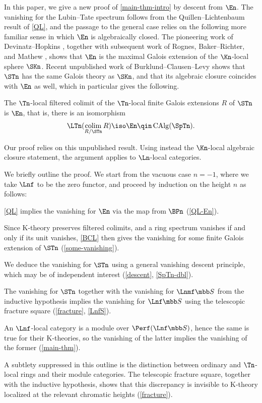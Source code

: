 In this paper, we give a new proof of \cref{main-thm-intro} by descent from $\En$.
The vanishing for the Lubin--Tate spectrum follows from the Quillen--Lichtenbaum result of \cref{QL}, and the passage to the general case relies on the following more familiar sense in which $\En$ is algebraically closed.
The pioneering work of Devinatz--Hopkins \cite{DH}, together with subsequent work of Rognes, Baker--Richter, and Mathew \cite{RognesGalois,BR-Galois,MatGal}, shows that $\En$ is the maximal Galois extension of the $\Kn$-local sphere $\SKn$.
Recent unpublished work of Burklund--Clausen--Levy shows that $\STn$ has the same Galois theory as $\SKn$, and that its algebraic closure coincides with $\En$ as well, which in particular gives the following.

\begin{thm}\label{BCL}
	The $\Tn$-local filtered colimit of the $\Tn$-local finite Galois extensions $R$ of $\STn$ is $\En$, that is, there is an isomorphism
	\[
		\LTn(\colim_{R/\STn} R) \iso \En
		\qin \CAlg(\SpTn).
	\]
\end{thm}

\begin{remark}
	Our proof relies on this unpublished result.
	Using instead the $\Kn$-local algebraic closure statement, the argument applies to $\Ln$-local categories.
\end{remark}

We briefly outline the proof.
We start from the vacuous case $n = -1$, where we take $\Lnf$ to be the zero functor, and proceed by induction on the height $n$ as follows:

\begin{steps}
	\item \cref{QL} implies the vanishing for $\En$ via the map from $\BPn$ (\cref{QL-En}).
	\item Since K-theory preserves filtered colimits, and a ring spectrum vanishes if and only if its unit vanishes, \cref{BCL} then gives the vanishing for some finite Galois extension of $\STn$ (\cref{some-vanishing}).
	\item We deduce the vanishing for $\STn$ using a general vanishing descent principle, which may be of independent interest (\cref{descent}, \cref{SpTn-dbl}).
	\item The vanishing for $\STn$ together with the vanishing for $\Lnmf\SS$ from the inductive hypothesis implies the vanishing for $\Lnf\SS$ using the telescopic fracture square (\cref{fracture}, \cref{LnfS}).
	\item An $\Lnf$-local category is a module over $\Perf(\Lnf\SS)$, hence the same is true for their K-theories, so the vanishing of the latter implies the vanishing of the former (\cref{main-thm}).
\end{steps}

A subtlety suppressed in this outline is the distinction between ordinary and $\Tn$-local rings and their module categories.
The telescopic fracture square, together with the inductive hypothesis, shows that this discrepancy is invisible to K-theory localized at the relevant chromatic heights (\cref{fracture}).

